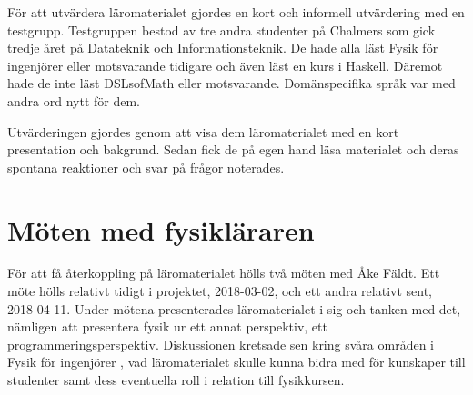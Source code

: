 För att utvärdera läromaterialet gjordes en kort och informell utvärdering med
en testgrupp. Testgruppen bestod av tre andra studenter på Chalmers som gick
tredje året på Datateknik och Informationsteknik. De hade alla läst Fysik för
ingenjörer eller motsvarande tidigare och även läst en kurs i Haskell.
Däremot hade de inte läst DSLsofMath eller motsvarande. Domänspecifika språk var
med andra ord nytt för dem.

Utvärderingen gjordes genom att visa dem läromaterialet med en kort
presentation och bakgrund. Sedan fick de på egen hand läsa materialet och deras
spontana reaktioner och svar på frågor noterades.

\section{Möten med fysikläraren}

För att få återkoppling på läromaterialet hölls två möten med Åke Fäldt. Ett möte hölls relativt
tidigt i projektet, 2018-03-02, och ett andra relativt sent, 2018-04-11.
Under mötena presenterades läromaterialet i sig och tanken med det, nämligen att
presentera fysik ur ett annat perspektiv, ett
programmeringsperspektiv. Diskussionen kretsade sen kring svåra områden i Fysik för
ingenjörer
, vad läromaterialet skulle kunna
bidra med för kunskaper till studenter samt dess eventuella roll i relation till
fysikkursen.
